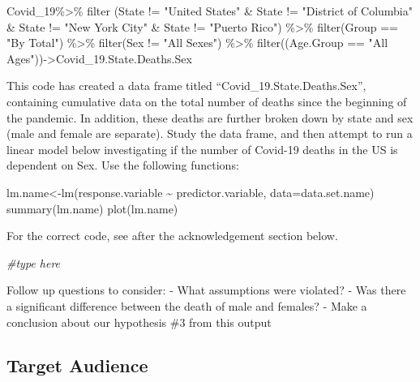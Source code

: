 \documentclass[
]{article}
\newenvironment{Shaded}{\begin{snugshade}}{\end{snugshade}}
\newcommand{\CommentTok}[1]{\textcolor[rgb]{0.56,0.35,0.01}{\textit{#1}}}
\newcommand{\FunctionTok}[1]{\textcolor[rgb]{0.00,0.00,0.00}{#1}}
\newcommand{\NormalTok}[1]{#1}
\newcommand{\OtherTok}[1]{\textcolor[rgb]{0.56,0.35,0.01}{#1}}
\newcommand{\SpecialCharTok}[1]{\textcolor[rgb]{0.00,0.00,0.00}{#1}}
\newcommand{\StringTok}[1]{\textcolor[rgb]{0.31,0.60,0.02}{#1}}
\begin{document}
\begin{Shaded}
\begin{Highlighting}[]
\NormalTok{Covid\_19}\SpecialCharTok{\%\textgreater{}\%}
  \FunctionTok{filter}\NormalTok{ (State }\SpecialCharTok{!=} \StringTok{"United States"} \SpecialCharTok{\&}\NormalTok{ State }\SpecialCharTok{!=} \StringTok{"District of Columbia"} \SpecialCharTok{\&}\NormalTok{ State }\SpecialCharTok{!=} \StringTok{"New York City"} \SpecialCharTok{\&}\NormalTok{ State }\SpecialCharTok{!=} \StringTok{"Puerto Rico"}\NormalTok{) }\SpecialCharTok{\%\textgreater{}\%}
  \FunctionTok{filter}\NormalTok{(Group }\SpecialCharTok{==} \StringTok{"By Total"}\NormalTok{) }\SpecialCharTok{\%\textgreater{}\%}
  \FunctionTok{filter}\NormalTok{(Sex }\SpecialCharTok{!=} \StringTok{"All Sexes"}\NormalTok{) }\SpecialCharTok{\%\textgreater{}\%} 
  \FunctionTok{filter}\NormalTok{((Age.Group }\SpecialCharTok{==} \StringTok{"All Ages"}\NormalTok{))}\OtherTok{{-}\textgreater{}}\NormalTok{Covid\_19.State.Deaths.Sex}
\end{Highlighting}
\end{Shaded}

This code has created a data frame titled
``Covid\_19.State.Deaths.Sex'', containing cumulative data on the total
number of deaths since the beginning of the pandemic. In addition, these
deaths are further broken down by state and sex (male and female are
separate). Study the data frame, and then attempt to run a linear model
below investigating if the number of Covid-19 deaths in the US is
dependent on Sex. Use the following functions:

lm.name\textless-lm(response.variable \textasciitilde{}
predictor.variable, data=data.set.name) summary(lm.name) plot(lm.name)

For the correct code, see after the acknowledgement section below.

\begin{Shaded}
\begin{Highlighting}[]
\CommentTok{\#type here}
\end{Highlighting}
\end{Shaded}

Follow up questions to consider: - What assumptions were violated? - Was
there a significant difference between the death of male and females? -
Make a conclusion about our hypothesis \#3 from this output

\hypertarget{target-audience}{%
\subsection{Target Audience}\label{target-audience}}
\end{document}
